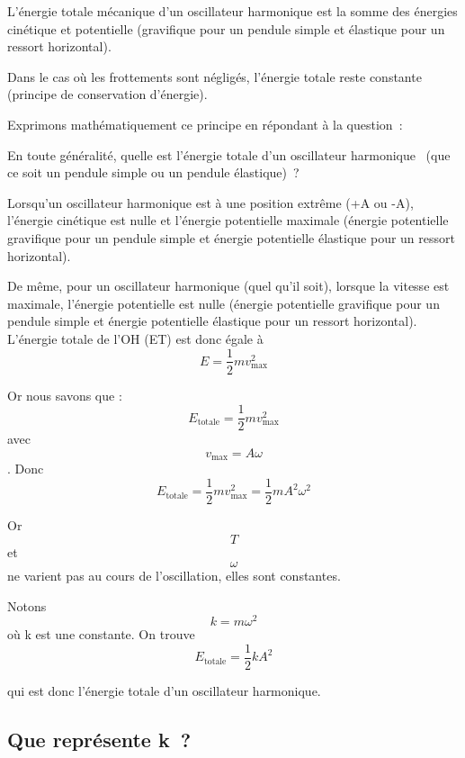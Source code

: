 L'énergie totale mécanique d'un oscillateur harmonique est la somme des
énergies cinétique et potentielle (gravifique pour un pendule simple et
élastique pour un ressort horizontal).

Dans le cas où les frottements sont négligés, l'énergie totale reste
constante (principe de conservation d'énergie).

Exprimons mathématiquement ce principe en répondant à la question~:

En toute généralité, quelle est l'énergie totale d'un oscillateur
harmonique~ (que ce soit un pendule simple ou un pendule élastique)~?

Lorsqu'un oscillateur harmonique est à une position extrême (+A ou -A),
l'énergie cinétique est nulle et l'énergie potentielle maximale (énergie
potentielle gravifique pour un pendule simple et énergie potentielle
élastique pour un ressort horizontal).

De même, pour un oscillateur harmonique (quel qu'il soit), lorsque la
vitesse est maximale, l'énergie potentielle est nulle (énergie
potentielle gravifique pour un pendule simple et énergie potentielle
élastique pour un ressort horizontal). L'énergie totale de l'OH (ET) est
donc égale à\[{E = \frac{1}{2}}mv_{\text{max}}^{2}\]

Or nous savons que :
\[{E_{\text{totale}} = \frac{1}{2}}mv_{\text{max}}^{2}\] avec
\[{v_{\text{max}} = A}\omega\]. Donc
\[{E_{\text{totale}} = \frac{1}{2}}m{v_{\text{max}}^{2} = \frac{1}{2}}mA^{2}\omega^{2}\]

Or \[T\] et \[\omega\] ne varient pas au cours de l'oscillation, elles
sont constantes.

Notons\[{k = m}\omega^{2}\] où k est une constante. On
trouve\[{E_{\text{totale}} = \frac{1}{2}}kA^{2}\]

qui est donc l'énergie totale d'un oscillateur harmonique.

\hypertarget{section}{%
\subsection{}\label{section}}

\hypertarget{que-repruxe9sente-k}{%
\subsection[Que représente k~?
]{\texorpdfstring{\protect\hypertarget{anchor-4}{}{}Que représente k~?
}{Que représente k~? }}\label{que-repruxe9sente-k}}

